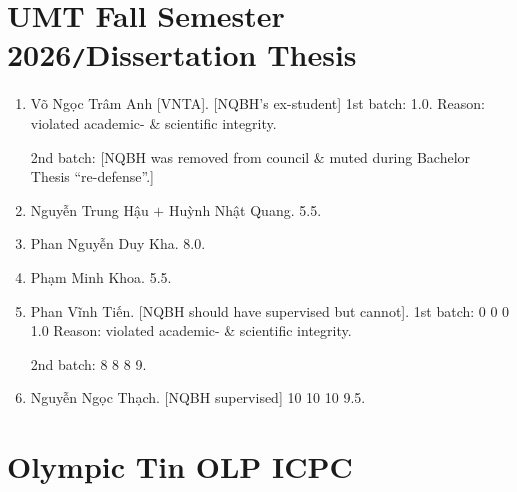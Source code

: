 \documentclass{article}
\begin{document}

\section{UMT Fall Semester 2026{\tt/}Dissertation Thesis}

\begin{enumerate}
	\item {\sc Võ Ngọc Trâm Anh [VNTA].} [NQBH's ex-student] 1st batch: 1.0. Reason: violated academic- \& scientific integrity.
	
	2nd batch: [NQBH was removed from council \& muted during Bachelor Thesis ``re-defense''.]
	\item {\sc Nguyễn Trung Hậu $+$ Huỳnh Nhật Quang.} 5.5.
	\item {\sc Phan Nguyễn Duy Kha.} 8.0.
	\item {\sc Phạm Minh Khoa.} 5.5.
	\item {\sc Phan Vĩnh Tiến.} [NQBH should have supervised but cannot]. 1st batch: 0 0 0 1.0 Reason: violated academic- \& scientific integrity.
	
	2nd batch: 8 8 8 9.
	\item {\sc Nguyễn Ngọc Thạch.} [NQBH supervised] 10 10 10 9.5.
\end{enumerate}


\section{Olympic Tin OLP ICPC}
\end{document}
